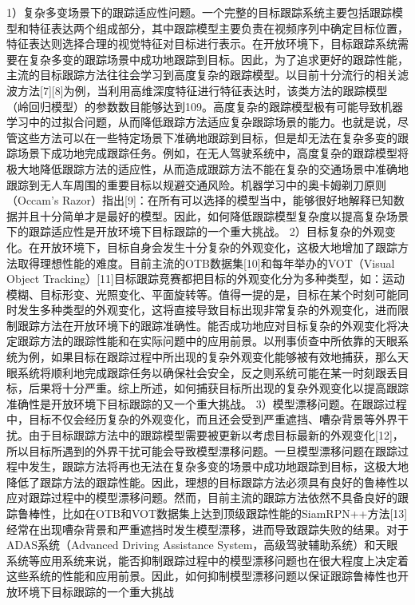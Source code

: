 \documentclass[a4paper,zihao=-4]{article}
\begin{document}
1）复杂多变场景下的跟踪适应性问题。一个完整的目标跟踪系统主要包括跟踪模型和特征表达两个组成部分，其中跟踪模型主要负责在视频序列中确定目标位置，特征表达则选择合理的视觉特征对目标进行表示。在开放环境下，目标跟踪系统需要在复杂多变的跟踪场景中成功地跟踪到目标。因此，为了追求更好的跟踪性能，主流的目标跟踪方法往往会学习到高度复杂的跟踪模型。以目前十分流行的相关滤波方法[7][8]为例，当利用高维深度特征进行特征表达时，该类方法的跟踪模型（岭回归模型）的参数数目能够达到109。高度复杂的跟踪模型极有可能导致机器学习中的过拟合问题，从而降低跟踪方法适应复杂跟踪场景的能力。也就是说，尽管这些方法可以在一些特定场景下准确地跟踪到目标，但是却无法在复杂多变的跟踪场景下成功地完成跟踪任务。例如，在无人驾驶系统中，高度复杂的跟踪模型将极大地降低跟踪方法的适应性，从而造成跟踪方法不能在复杂的交通场景中准确地跟踪到无人车周围的重要目标以规避交通风险。机器学习中的奥卡姆剃刀原则（Occam’s Razor）指出[9]：在所有可以选择的模型当中，能够很好地解释已知数据并且十分简单才是最好的模型。因此，如何降低跟踪模型复杂度以提高复杂场景下的跟踪适应性是开放环境下目标跟踪的一个重大挑战。
2）目标复杂的外观变化。在开放环境下，目标自身会发生十分复杂的外观变化，这极大地增加了跟踪方法取得理想性能的难度。目前主流的OTB数据集[10]和每年举办的VOT（Visual Object Tracking）[11]目标跟踪竞赛都把目标的外观变化分为多种类型，如：运动模糊、目标形变、光照变化、平面旋转等。值得一提的是，目标在某个时刻可能同时发生多种类型的外观变化，这将直接导致目标出现非常复杂的外观变化，进而限制跟踪方法在开放环境下的跟踪准确性。能否成功地应对目标复杂的外观变化将决定跟踪方法的跟踪性能和在实际问题中的应用前景。以刑事侦查中所依靠的天眼系统为例，如果目标在跟踪过程中所出现的复杂外观变化能够被有效地捕获，那么天眼系统将顺利地完成跟踪任务以确保社会安全，反之则系统可能在某一时刻跟丢目标，后果将十分严重。综上所述，如何捕获目标所出现的复杂外观变化以提高跟踪准确性是开放环境下目标跟踪的又一个重大挑战。
3）模型漂移问题。在跟踪过程中，目标不仅会经历复杂的外观变化，而且还会受到严重遮挡、嘈杂背景等外界干扰。由于目标跟踪方法中的跟踪模型需要被更新以考虑目标最新的外观变化[12]，所以目标所遇到的外界干扰可能会导致模型漂移问题。一旦模型漂移问题在跟踪过程中发生，跟踪方法将再也无法在复杂多变的场景中成功地跟踪到目标，这极大地降低了跟踪方法的跟踪性能。因此，理想的目标跟踪方法必须具有良好的鲁棒性以应对跟踪过程中的模型漂移问题。然而，目前主流的跟踪方法依然不具备良好的跟踪鲁棒性，比如在OTB和VOT数据集上达到顶级跟踪性能的SiamRPN++方法[13]经常在出现嘈杂背景和严重遮挡时发生模型漂移，进而导致跟踪失败的结果。对于ADAS系统（Advanced Driving Assistance System，高级驾驶辅助系统）和天眼系统等应用系统来说，能否抑制跟踪过程中的模型漂移问题也在很大程度上决定着这些系统的性能和应用前景。因此，如何抑制模型漂移问题以保证跟踪鲁棒性也开放环境下目标跟踪的一个重大挑战
\end{document}
